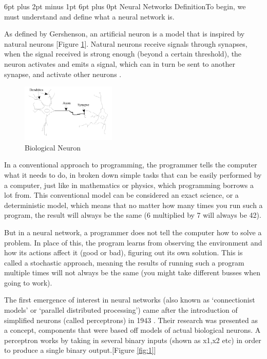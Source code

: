 \documentclass[12pt,a4paper]{article}
\makeatletter
\renewcommand\subsection{\@startsection {subsection}{1}{2mm} %
                               {6pt plus 2pt minus 1pt} %
                               {6pt plus 0pt} %
                               {\normalfont\bfseries}}
\makeatother
\begin{document}
\subsection{Neural Networks Definition}To begin, we must understand and define what a neural network is.\par
As defined by Gershenson, an artificial neuron is a model that is inspired by natural neurons [Figure \ref{fig:5}]. Natural neurons receive signals through synapses, when the signal received is strong enough (beyond a certain threshold), the neuron activates and emits a signal, which can in turn be sent to another synapse, and activate other neurons \cite{gershenson_artificial_2003}.\par
\begin{figure}[h]
	\includegraphics[width=0.4\textwidth]{neuron}
	\centering
	\caption{Biological Neuron \protect \cite{gershenson_artificial_2003}}
	\label{fig:5}
\end{figure}
In a conventional approach to programming, the programmer tells the computer what it needs to do, in broken down simple tasks that can be easily performed by a computer, just like in mathematics or physics, which programming borrows a lot from. This conventional model can be considered an exact science, or a deterministic model, which means that no matter how many times you run such a program, the result will always be the same (6 multiplied by 7 will always be 42).\par
But in a neural network, a programmer does not tell the computer how to solve a problem. In place of this, the program learns from observing the environment and how its actions affect it (good or bad), figuring out its own solution. This is called a stochastic approach, meaning the results of running such a program multiple times will not always be the same (you might take different busses when going to work).\par
The first emergence of interest in neural networks (also known as ‘connectionist models’ or ‘parallel distributed processing’) \cite{krose_introduction_1993} came after the introduction of simplified neurons (called perceptrons) in 1943 \cite{mcculloch_logical_1943}. Their research was presented as a concept, components that were based off models of actual biological neurons. A perceptron works by taking in several binary inputs (shown as x1,x2 etc)  in order to produce a single binary output.[Figure \ref{fig:1}]
\end{document}
